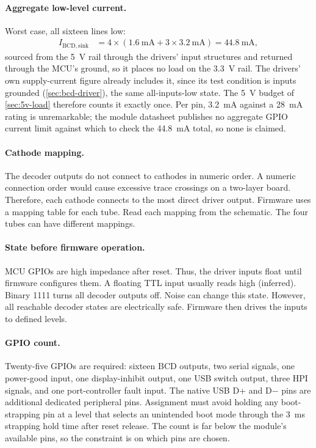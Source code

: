 \paragraph{Aggregate low-level current.} Worst case, all sixteen lines low:
\begin{align*}
  I_{\mathrm{BCD,sink}} &= 4 \times \left(\SI{1.6}{\milli\ampere}
    + 3\times\SI{3.2}{\milli\ampere}\right) = \SI{44.8}{\milli\ampere},
\end{align*}
sourced from the 5~V rail through the drivers' input structures and returned
through the MCU's ground, so it places no load on the 3.3~V rail. The drivers'
own supply-current figure already includes it, since its test condition is
inputs grounded (\cref{sec:bcd-driver}), the same all-inputs-low state. The 5~V
budget of \cref{sec:5v-load} therefore counts it exactly once. Per pin,
\SI{3.2}{\milli\ampere} against a \SI{28}{\milli\ampere}
rating is unremarkable; the module datasheet publishes no aggregate GPIO
current limit against which to check the \SI{44.8}{\milli\ampere} total, so
none is claimed.

\paragraph{Cathode mapping.} The decoder outputs do not connect to cathodes in
numeric order. A numeric connection order would cause excessive trace crossings
on a two-layer board. Therefore, each cathode connects to the most direct driver
output. Firmware uses a mapping table for each tube. Read each mapping from the
schematic. The four tubes can have different mappings.

\paragraph{State before firmware operation.} MCU GPIOs are high impedance after
reset. Thus, the driver inputs float until firmware configures them. A floating
TTL input usually reads high (inferred). Binary 1111 turns all decoder outputs
off. Noise can change this state. However, all reachable decoder states are
electrically safe. Firmware then drives the inputs to defined levels.

\paragraph{GPIO count.} Twenty-five GPIOs are required: sixteen BCD outputs,
two serial signals, one power-good input, one display-inhibit output, one USB
switch output, three HPI signals, and one port-controller fault input. The
native USB D+ and D$-$ pins are additional dedicated peripheral pins.
Assignment must avoid holding any
boot-strapping pin at a level that selects an unintended boot mode through
the \SI{3}{\milli\second} strapping hold time after reset release. The count is
far below the module's available pins, so the constraint is on which pins are
chosen.

